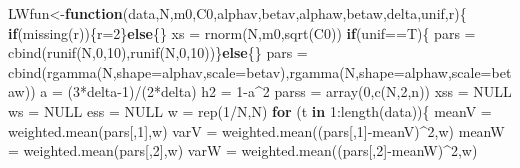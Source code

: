 \documentclass[
]{article}
\newenvironment{Shaded}{\begin{snugshade}}{\end{snugshade}}
\newcommand{\AttributeTok}[1]{\textcolor[rgb]{0.77,0.63,0.00}{#1}}
\newcommand{\ConstantTok}[1]{\textcolor[rgb]{0.00,0.00,0.00}{#1}}
\newcommand{\ControlFlowTok}[1]{\textcolor[rgb]{0.13,0.29,0.53}{\textbf{#1}}}
\newcommand{\DecValTok}[1]{\textcolor[rgb]{0.00,0.00,0.81}{#1}}
\newcommand{\FunctionTok}[1]{\textcolor[rgb]{0.00,0.00,0.00}{#1}}
\newcommand{\NormalTok}[1]{#1}
\newcommand{\OtherTok}[1]{\textcolor[rgb]{0.56,0.35,0.01}{#1}}
\newcommand{\SpecialCharTok}[1]{\textcolor[rgb]{0.00,0.00,0.00}{#1}}
\begin{document}
\begin{Shaded}
\begin{Highlighting}[]
\NormalTok{LWfun}\OtherTok{\textless{}{-}}\ControlFlowTok{function}\NormalTok{(data,N,m0,C0,alphav,betav,alphaw,betaw,delta,unif,r)\{}
  \ControlFlowTok{if}\NormalTok{(}\FunctionTok{missing}\NormalTok{(r))\{r}\OtherTok{=}\DecValTok{2}\NormalTok{\}}\ControlFlowTok{else}\NormalTok{\{\}}
\NormalTok{  xs     }\OtherTok{=} \FunctionTok{rnorm}\NormalTok{(N,m0,}\FunctionTok{sqrt}\NormalTok{(C0))}
  \ControlFlowTok{if}\NormalTok{(unif}\SpecialCharTok{==}\NormalTok{T)\{}
\NormalTok{  pars   }\OtherTok{=} \FunctionTok{cbind}\NormalTok{(}\FunctionTok{runif}\NormalTok{(N,}\DecValTok{0}\NormalTok{,}\DecValTok{10}\NormalTok{),}\FunctionTok{runif}\NormalTok{(N,}\DecValTok{0}\NormalTok{,}\DecValTok{10}\NormalTok{))\}}\ControlFlowTok{else}\NormalTok{\{\}}
\NormalTok{  pars   }\OtherTok{=} \FunctionTok{cbind}\NormalTok{(}\FunctionTok{rgamma}\NormalTok{(N,}\AttributeTok{shape=}\NormalTok{alphav,}\AttributeTok{scale=}\NormalTok{betav),}\FunctionTok{rgamma}\NormalTok{(N,}\AttributeTok{shape=}\NormalTok{alphaw,}\AttributeTok{scale=}\NormalTok{betaw))}
\NormalTok{  a      }\OtherTok{=}\NormalTok{ (}\DecValTok{3}\SpecialCharTok{*}\NormalTok{delta}\DecValTok{{-}1}\NormalTok{)}\SpecialCharTok{/}\NormalTok{(}\DecValTok{2}\SpecialCharTok{*}\NormalTok{delta)}
\NormalTok{  h2     }\OtherTok{=} \DecValTok{1}\SpecialCharTok{{-}}\NormalTok{a}\SpecialCharTok{\^{}}\DecValTok{2}
\NormalTok{  parss  }\OtherTok{=} \FunctionTok{array}\NormalTok{(}\DecValTok{0}\NormalTok{,}\FunctionTok{c}\NormalTok{(N,}\DecValTok{2}\NormalTok{,n))}
\NormalTok{  xss    }\OtherTok{=} \ConstantTok{NULL}
\NormalTok{  ws     }\OtherTok{=} \ConstantTok{NULL}
\NormalTok{  ess    }\OtherTok{=} \ConstantTok{NULL}
\NormalTok{  w      }\OtherTok{=} \FunctionTok{rep}\NormalTok{(}\DecValTok{1}\SpecialCharTok{/}\NormalTok{N,N)}
  \ControlFlowTok{for}\NormalTok{ (t }\ControlFlowTok{in} \DecValTok{1}\SpecialCharTok{:}\FunctionTok{length}\NormalTok{(data))\{}
\NormalTok{    meanV }\OtherTok{=} \FunctionTok{weighted.mean}\NormalTok{(pars[,}\DecValTok{1}\NormalTok{],w)}
\NormalTok{    varV  }\OtherTok{=} \FunctionTok{weighted.mean}\NormalTok{((pars[,}\DecValTok{1}\NormalTok{]}\SpecialCharTok{{-}}\NormalTok{meanV)}\SpecialCharTok{\^{}}\DecValTok{2}\NormalTok{,w)}
\NormalTok{    meanW }\OtherTok{=} \FunctionTok{weighted.mean}\NormalTok{(pars[,}\DecValTok{2}\NormalTok{],w)}
\NormalTok{    varW  }\OtherTok{=} \FunctionTok{weighted.mean}\NormalTok{((pars[,}\DecValTok{2}\NormalTok{]}\SpecialCharTok{{-}}\NormalTok{meanW)}\SpecialCharTok{\^{}}\DecValTok{2}\NormalTok{,w)}
    

\end{Highlighting}
\end{Shaded}
\end{document}

